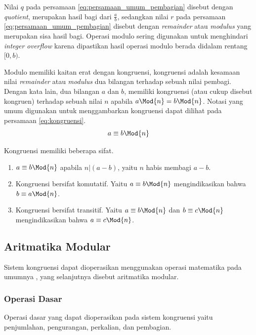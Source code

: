 Nilai $ q $ pada persamaan \eqref{eq:persamaan_umum_pembagian} disebut dengan \textit{quotient}, merupakan hasil bagi dari $ \frac{a}{b} $, sedangkan nilai $ r $ pada persamaan \eqref{eq:persamaan_umum_pembagian} disebut dengan \textit{remainder} atau \textit{modulus} yang merupakan sisa hasil bagi. Operasi modulo sering digunakan untuk menghindari \textit{integer overflow} karena dipastikan hasil operasi modulo berada didalam rentang $ [0,b) $.

Modulo memiliki kaitan erat dengan kongruensi, kongruensi adalah kesamaan nilai \textit{remainder} atau \textit{modulus} dua bilangan terhadap sebuah nilai pembagi. Dengan kata lain, dua bilangan $ a $ dan $ b $, memiliki kongruensi (atau cukup disebut kongruen) terhadap sebuah nilai $ n $ apabila $a \Mod{n}=b \Mod{n}$. Notasi yang umum digunakan untuk menggambarkan kongruensi dapat dilihat pada persamaan \eqref{eq:kongruensi}.
\begin{equation}
	a\equiv b \Mod{n}
	\label{eq:kongruensi}
\end{equation}

Kongruensi memiliki beberapa sifat.\cite{stallings_cryptography}
\begin{enumerate}
	\item $ a\equiv b \Mod{n} $ apabila $ n|(a - b) $, yaitu $ n $ habis membagi $ a-b $.
	\item Kongruensi bersifat komutatif. Yaitu $ a\equiv b \Mod{n} $ mengindikasikan bahwa $ b\equiv a \Mod{n} $.
	\item Kongruensi bersifat transitif. Yaitu $ a\equiv b \Mod{n} $ dan $ b\equiv c \Mod{n} $ mengindikasikan bahwa $a \equiv c \Mod{n} $.
\end{enumerate}

\subsection{Aritmatika Modular}
Sistem kongruensi dapat dioperasikan menggunakan operasi matematika pada umumnya \cite{stallings_cryptography}, yang selanjutnya disebut aritmatika modular.

\subsubsection{Operasi Dasar}
Operasi dasar yang dapat dioperasikan pada sistem kongruensi yaitu penjumlahan, pengurangan, perkalian, dan pembagian.

